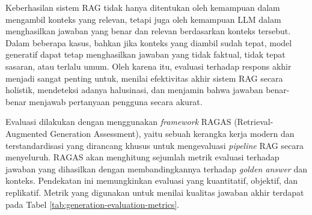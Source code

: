 Keberhasilan sistem RAG tidak hanya ditentukan oleh kemampuan dalam mengambil konteks yang relevan, tetapi juga oleh kemampuan LLM dalam menghasilkan jawaban yang benar dan relevan berdasarkan konteks tersebut.
Dalam beberapa kasus, bahkan jika konteks yang diambil sudah tepat, model generatif dapat tetap menghasilkan jawaban yang tidak faktual, tidak tepat sasaran, atau terlalu umum.
Oleh karena itu, evaluasi terhadap respons akhir menjadi sangat penting untuk, menilai efektivitas akhir sistem RAG secara holistik, mendeteksi adanya halusinasi, dan menjamin bahwa jawaban benar-benar menjawab pertanyaan pengguna secara akurat.

\vspace{1cm}
Evaluasi dilakukan dengan menggunakan \textit{framework} RAGAS (Retrieval-Augmented Generation Assessment), yaitu sebuah kerangka kerja modern dan terstandardisasi yang dirancang khusus untuk mengevaluasi \textit{pipeline} RAG secara menyeluruh.
RAGAS akan menghitung sejumlah metrik evaluasi terhadap jawaban yang dihasilkan dengan membandingkannya terhadap \textit{golden answer} dan konteks. Pendekatan ini memungkinkan evaluasi yang kuantitatif, objektif, dan replikatif.
Metrik yang digunakan untuk menilai kualitas jawaban akhir terdapat pada Tabel \ref{tab:generation-evaluation-metrics}.

